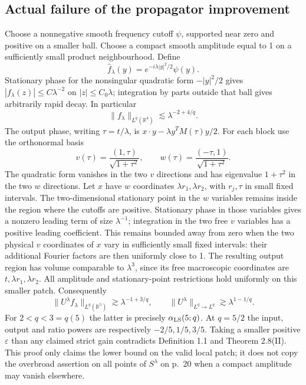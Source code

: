 \documentclass[10pt]{article}
\begin{document}
\subsection*{Actual failure of the propagator improvement}
Choose a nonnegative smooth frequency cutoff \(\psi\), supported near zero and positive on a smaller ball. Choose a compact smooth amplitude equal to 1 on a sufficiently small product neighbourhood. Define \[\widehat f_\lambda(y)=e^{-i\lambda |y|^2/2}\psi(y).\] Stationary phase for the nonsingular quadratic form \(-|y|^2/2\) gives \(|f_\lambda(z)|\leq C\lambda^{-2}\) on \(|z|\leq C_0\lambda\); integration by parts outside that ball gives arbitrarily rapid decay. In particular \[\|f_\lambda\|_{L^q(\mathbb R^4)}\lesssim \lambda^{-2+4/q}.\] The output phase, writing \(\tau=t/\lambda\), is \(x\cdot y-\lambda y^TM(\tau)y/2\). For each block use the orthonormal basis \[v(\tau)=\frac{(1,\tau)}{\sqrt{1+\tau^2}},\qquad
 w(\tau)=\frac{(-\tau,1)}{\sqrt{1+\tau^2}} .\] The quadratic form vanishes in the two \(v\) directions and has eigenvalue \(1+\tau^2\) in the two \(w\) directions. Let \(x\) have \(w\) coordinates \(\lambda r_1,\lambda r_2\), with \(r_j,\tau\) in small fixed intervals. The two-dimensional stationary point in the \(w\) variables remains inside the region where the cutoffs are positive. Stationary phase in those variables gives a nonzero leading term of size \(\lambda^{-1}\); integration in the two free \(v\) variables has a positive leading coefficient. This remains bounded away from zero when the two physical \(v\) coordinates of \(x\) vary in sufficiently small fixed intervals: their additional Fourier factors are then uniformly close to 1. The resulting output region has volume comparable to \(\lambda^3\), since its free macroscopic coordinates are \(t,\lambda r_1,\lambda r_2\). All amplitude and stationary-point restrictions hold uniformly on this smaller patch. Consequently \[\|U^\lambda f_\lambda\|_{L^q(\mathbb R^5)}
 \gtrsim \lambda^{-1+3/q},\qquad
 \|U^\lambda\|_{L^q\to L^q}\gtrsim\lambda^{1-1/q}.\] For \(2<q<3=q(5)\) the latter is precisely \(\alpha_{\rm LS}(5;q)\). At \(q=5/2\) the input, output and ratio powers are respectively \(-2/5,1/5,3/5\). Taking a smaller positive \(\varepsilon\) than any claimed strict gain contradicts Definition 1.1 and Theorem 2.8(II). This proof only claims the lower bound on the valid local patch; it does not copy the overbroad assertion on all points of \(S^\lambda\) on p. 20 when a compact amplitude may vanish elsewhere.\par
\end{document}
